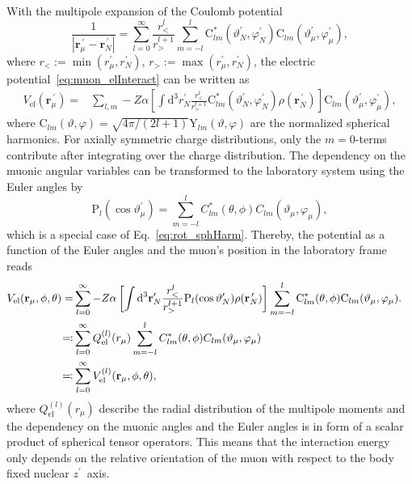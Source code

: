 With the multipole expansion of the Coulomb potential~\cite{jackson1999}
\begin{equation}
\frac{1}{|\mathbf{r}_\mu^{\,\prime}-\mathbf{r}_N^{\,\prime}|}=\sum_{l=0}^\infty \frac{r_<^l}{r_>^{l+1}}\sum_{m=-l}^l  \text{C}^*_{lm}(\vartheta_N^{\prime},\varphi_N^{\prime})\text{C}_{lm}(\vartheta_\mu^\prime,\varphi_\mu^\prime),
\end{equation}
where $r_<:=\min (r_\mu^\prime,r_N^\prime)$, $r_>:=\max (r_\mu^\prime,r_N^\prime)$, the electric potential~\eqref{eq:muon_elInteract} can be written as
\begin{align}
V_{\text{el}}(\mathbf{r}_\mu^{\,\prime})=&\sum_{l,m}-Z\alpha \left[ \int \text{d}^3r^{\prime}_N \frac{r_<^l}{r_>^{l+1}}\text{C}^*_{lm}(\vartheta_N^{\prime},\varphi_N^{\prime})\rho(\mathbf{r}_N^{\,\prime})\right]\text{C}_{lm}(\vartheta_\mu^{\prime},\varphi_\mu^\prime),
\end{align}
where ${\text{C}_{lm}(\vartheta,\varphi)}{=}{\sqrt{4\pi/(2l+1)}\text{Y}_{lm}(\vartheta,\varphi)}$ are the normalized spherical harmonics.
For axially symmetric charge distributions, only the ${m}{=}{0}$-terms contribute after integrating over the charge distribution. The dependency on the muonic angular variables can be transformed to the laboratory system using the Euler angles by
\begin{equation}
\text{P}_{l}(\cos\vartheta_\mu^\prime)=
 \sum_{m=-l}^l C^*_{lm}(\theta,\phi)C_{lm}(\vartheta_\mu,\varphi_\mu),
\end{equation}
which is a special case of Eq.~\eqref{eq:rot_sphHarm}.
Thereby, the potential as a function of the Euler angles and the muon's position in the laboratory frame reads
\begin{align}
V_{\text{el}}(\mathbf{r}_\mu,\phi,\theta)=&\sum_{l=0}^\infty-Z\alpha \left[ \int \text{d}^3\mathbf{r}^{\prime}_N \frac{r_<^l}{r_>^{l+1}}\text{P}_{l}(\cos \vartheta_N^{\prime})\rho(\mathbf{r}_N^{\,\prime})\right]\sum_{m=-l}^l \text{C}^*_{lm}(\theta,\phi)\text{C}_{lm}(\vartheta_\mu,\varphi_\mu).\notag\\
\eqqcolon &\sum_{l=0}^\infty Q_{\text{el}}^{(l)}(r_\mu)\sum_{m=-l}^lC^*_{lm}(\theta,\phi)C_{lm}(\vartheta_\mu,\varphi_\mu)&\notag\\
\eqqcolon& \sum_{l=0}^\infty V^{(l)}_{\text{el}}(\mathbf{r}_\mu,\phi,\theta),
\label{eq:defmulti}
\end{align}
where $Q_{\text{el}}^{(l)}(r_\mu)$ describe the radial distribution of the multipole moments and the dependency on the muonic angles and the Euler angles is in form of a scalar product of spherical tensor operators. This means that the interaction energy only depends on the relative orientation of the muon with respect to the body fixed nuclear $z^\prime$~axis.

